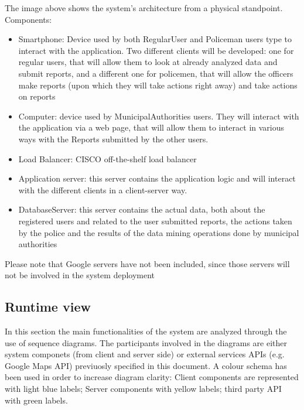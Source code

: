 The image above shows the system's architecture from a physical standpoint.
Components:
\begin{itemize}
\item Smartphone: Device used by both RegularUser and Policeman users type to interact with the application. Two different clients will be developed: one for regular users, that will allow them to look at already analyzed data and submit reports, and a different one for policemen, that will allow the officers make reports (upon which they will take actions right away) and take actions on reports
\item Computer: device used by MunicipalAuthorities users. They will interact with the application via a web page, that will allow them to interact in various ways with the Reports submitted by the other users.
\item Load Balancer: CISCO off-the-shelf load balancer
\item Application server: this server contains the application logic and will interact with the different clients in a client-server way.
\item DatabaseServer: this server contains the actual data, both about the registered users and related to the user submitted reports, the actions taken by the police and the results of the data mining operations done by municipal authorities
\end{itemize}
Please note that Google servers have not been included, since those servers will not be involved in the system deployment
\newpage

\subsection{Runtime view}
In this section the main functionalities of the system are analyzed through the use of sequence diagrams. The participants involved in the diagrams are either system componets (from client and server side) or external services APIs (e.g. Google Maps API) previuosly specified in this document.\newline
A colour schema has been used in order to increase diagram clarity: Client components are represented with light blue labels; Server components with yellow labels; third party API with green labels.

\medskip

